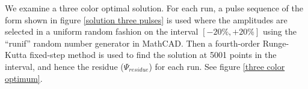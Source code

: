 We examine a three color optimal solution. For each run, a pulse sequence of the form shown in figure \ref{solution three pulses} is used where the amplitudes are selected in a uniform random fashion on the interval $[-20\%,+20\%]$ using the ``runif'' random number generator in MathCAD. Then a fourth-order Runge-Kutta fixed-step method is used to find the solution at 5001 points in the interval, and hence the residue ($\Psi_{residue}$) for each run. See figure \ref{three color optimum}.


